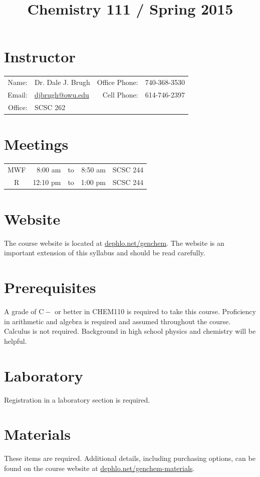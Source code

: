\documentclass[letterpaper,oneside,onecolumn,11pt,article]{memoir}
\title{Chemistry 111 / Spring 2015}
\date{}
\author{}
\begin{document}
\maketitle
\thispagestyle{courseinformationtitle}

\section{Instructor}
\begin{tabular}{rl|rl}
Name: & Dr. Dale J. Brugh & Office Phone: & 740-368-3530 \\
Email: & \href{mailto:djbrugh@owu.edu}{djbrugh@owu.edu} & Cell Phone: & 614-746-2397 \\
Office: & SCSC 262 & &  \\
\end{tabular}

\section{Meetings}
\begin{tabular}{crcrl}
MWF & 8:00 am & to & 8:50 am & SCSC 244 \\
R & 12:10 pm & to & 1:00 pm & SCSC 244
\end{tabular}

\section{Website}
The course website is located at \href{http://dephlo.net/genchem}{dephlo.net/genchem}. The website is an important extension of this syllabus and should be read carefully. 

\section{Prerequisites}
A grade of $\mathrm{C}-$ or better in CHEM110 is required to take this course. Proficiency in arithmetic and algebra is required and assumed throughout the course. Calculus is not required. Background in high school physics and chemistry will be helpful. 

\section{Laboratory}
Registration in a laboratory section is required. 

\section{Materials}
These items are required. Additional details, including purchasing options, can be found on the course website at \href{http://dephlo.net/genchem-materials}{dephlo.net/genchem-materials}.
\end{document}
